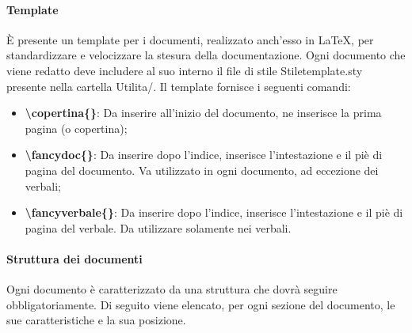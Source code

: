 \paragraph*{Template}
È presente un template per i documenti, realizzato anch'esso in \LaTeX{}, per standardizzare e velocizzare la stesura della documentazione.
Ogni documento che viene redatto deve includere al suo interno il file di stile Stiletemplate.sty presente nella cartella Utilita/.
Il template fornisce i seguenti comandi:
\begin{itemize}
\item \textbf{\textbackslash copertina\{\}}: Da inserire all'inizio del documento, ne inserisce la prima pagina (o copertina);
\item \textbf{\textbackslash fancydoc\{\}}: Da inserire dopo l'indice, inserisce l'intestazione e il piè di pagina del documento. Va utilizzato in ogni documento, ad eccezione dei verbali;
\item \textbf{\textbackslash fancyverbale\{\}}: Da inserire dopo l'indice, inserisce l'intestazione e il piè di pagina del verbale. Da utilizzare solamente nei verbali.
\end{itemize}

\paragraph*{Struttura dei documenti}
Ogni documento è caratterizzato da una struttura che dovrà seguire obbligatoriamente.
Di seguito viene elencato, per ogni sezione del documento, le sue caratteristiche e la sua posizione.


